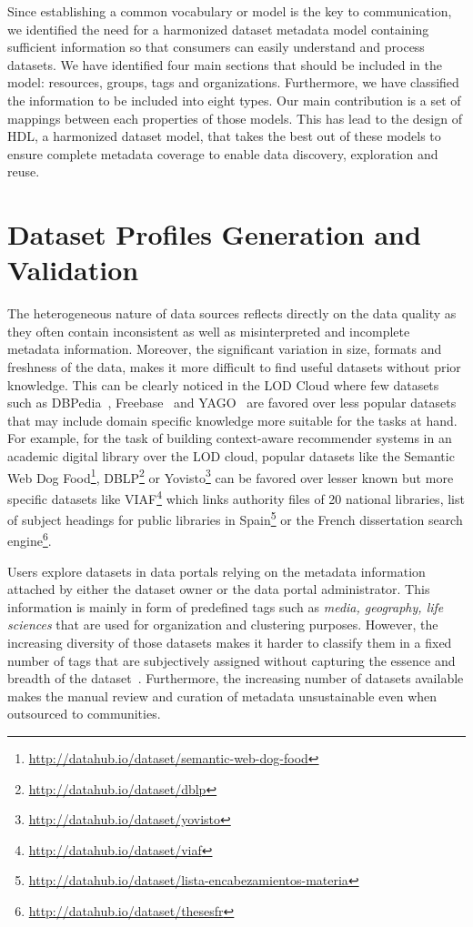 \documentclass[a4paper,11pt,twoside]{ThesisStyle}
\begin{document}
Since establishing a common vocabulary or model is the key to communication, we identified the need for a harmonized dataset metadata model containing sufficient information so that consumers can easily understand and process datasets. We have identified four main sections that should be included in the model: resources, groups, tags and organizations. Furthermore, we have classified the information to be included into eight types. Our main contribution is a set of mappings between each properties of those models. This has lead to the design of HDL, a harmonized dataset model, that takes the best out of these models to ensure complete metadata coverage to enable data discovery, exploration and reuse.

\section{Dataset Profiles Generation and Validation}\label{chapter:roomba}

The heterogeneous nature of data sources reflects directly on the data quality as they often contain inconsistent as well as misinterpreted and incomplete metadata information. Moreover, the significant variation in size, formats and freshness of the data, makes it more difficult to find useful datasets without prior knowledge. This can be clearly noticed in the LOD Cloud where few datasets such as DBPedia~\cite{Bizer:WebSemJorunal:09}, Freebase~\cite{Bollacker:SIGMOD:08} and YAGO~\cite{Suchanek::WWW:07} are favored over less popular datasets that may include domain specific knowledge more suitable for the tasks at hand. For example, for the task of building context-aware recommender systems in an academic digital library over the LOD cloud, popular datasets like the Semantic Web Dog Food\footnote{\url{http://datahub.io/dataset/semantic-web-dog-food}}, DBLP\footnote{\url{http://datahub.io/dataset/dblp}} or Yovisto\footnote{\url{http://datahub.io/dataset/yovisto}} can be favored over lesser known but more specific datasets like VIAF\footnote{\url{http://datahub.io/dataset/viaf}} which links authority files of 20 national libraries, list of subject headings for public libraries in Spain\footnote{\url{http://datahub.io/dataset/lista-encabezamientos-materia}} or the French dissertation search engine\footnote{\url{http://datahub.io/dataset/thesesfr}}.

Users explore datasets in data portals relying on the metadata information attached by either the dataset owner or the data portal administrator. This information is mainly in form of predefined tags such as \textit{media, geography, life sciences} that are used for organization and clustering purposes. However, the increasing diversity of those datasets makes it harder to classify them in a fixed number of tags that are subjectively assigned without capturing the essence and breadth of the dataset~\cite{Lalithsena:WI:13}. Furthermore, the increasing number of datasets available makes the manual review and curation of metadata unsustainable even when outsourced to communities.
\end{document}
